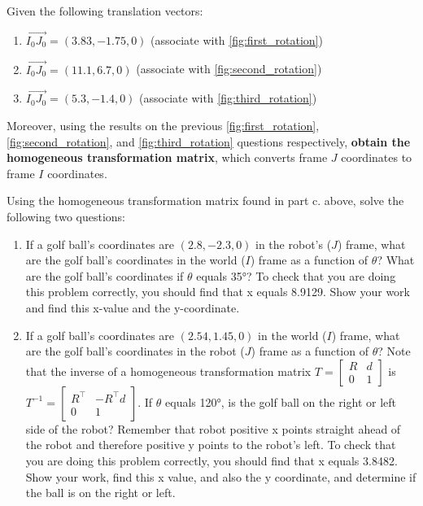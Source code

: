 \documentclass[11pt]{article}
\begin{document}
Given the following translation vectors:
%
\begin{enumerate}
    \item $\overrightarrow{I_0J_0} = (3.83, -1.75, 0)$ (associate with \ref{fig:first_rotation})
    \item $\overrightarrow{I_0J_0} = (11.1,6.7,0)$ (associate with \ref{fig:second_rotation})
    \item $\overrightarrow{I_0J_0} = (5.3,-1.4,0)$ (associate with \ref{fig:third_rotation})
\end{enumerate}
%
Moreover, using the results on the previous \ref{fig:first_rotation}, \ref{fig:second_rotation}, and \ref{fig:third_rotation} questions respectively, \textbf{obtain the homogeneous transformation matrix}, which converts frame $J$ coordinates to frame $I$ coordinates.

Using the homogeneous transformation matrix found in part c. above, solve the following two questions:
%
\begin{enumerate}
    \item If a golf ball’s coordinates are $(2.8,-2.3,0)$ in the robot’s ($J$) frame, what are the golf ball’s coordinates in the world ($I$) frame as a function of $\theta$? What are the golf ball’s coordinates if $\theta$ equals 35°? To check that you are doing this problem correctly, you should find that x equals 8.9129. Show your work and find this x-value and the y-coordinate.
    \item If a golf ball’s coordinates are $(2.54,1.45,0)$ in the world ($I$) frame, what are the golf ball’s coordinates in the robot ($J$) frame as a function of $\theta$? Note that the inverse of a homogeneous transformation matrix $T =
        \begin{bmatrix}
            R & d \\
            0 & 1
        \end{bmatrix}$ is $T^{-1} =
        \begin{bmatrix}
            R^\top & -R^\top d \\
            0 & 1
        \end{bmatrix}$. If $\theta$ equals 120°, is the golf ball on the right or left side of the robot? Remember that robot positive x points straight ahead of the robot and therefore positive y points to the robot’s left. To check that you are doing this problem correctly, you should find that x equals 3.8482. Show your work, find this x value, and also the y coordinate, and determine if the ball is on the right or left.
\end{enumerate}
%
\end{document}
